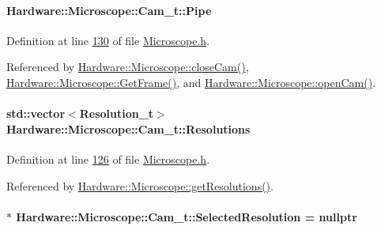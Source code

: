 \paragraph[{Pipe}]{ Hardware\+::\+Microscope\+::\+Cam\+\_\+t\+::\+Pipe}\label{struct_hardware_1_1_microscope_1_1_cam__t_a5cadb56c325736da812520b51c7fd65c}


Definition at line \hyperlink{_microscope_8h_source_l00130}{130} of file \hyperlink{_microscope_8h_source}{Microscope.\+h}.



Referenced by \hyperlink{_microscope_8cpp_source_l00311}{Hardware\+::\+Microscope\+::close\+Cam()}, \hyperlink{_microscope_8cpp_source_l00319}{Hardware\+::\+Microscope\+::\+Get\+Frame()}, and \hyperlink{_microscope_8cpp_source_l00167}{Hardware\+::\+Microscope\+::open\+Cam()}.

\hypertarget{struct_hardware_1_1_microscope_1_1_cam__t_a28496beff27af86c6305e0dd950001e9}{}
\paragraph[{Resolutions}]{\setlength{\rightskip}{0pt plus 5cm}std\+::vector$<${\bf Resolution\+\_\+t}$>$ Hardware\+::\+Microscope\+::\+Cam\+\_\+t\+::\+Resolutions}\label{struct_hardware_1_1_microscope_1_1_cam__t_a28496beff27af86c6305e0dd950001e9}


Definition at line \hyperlink{_microscope_8h_source_l00126}{126} of file \hyperlink{_microscope_8h_source}{Microscope.\+h}.



Referenced by \hyperlink{_microscope_8cpp_source_l00123}{Hardware\+::\+Microscope\+::get\+Resolutions()}.

\hypertarget{struct_hardware_1_1_microscope_1_1_cam__t_a85e4d902ee8a096450dbe544ec0ce773}{}
\paragraph[{Selected\+Resolution}]{$\ast$ Hardware\+::\+Microscope\+::\+Cam\+\_\+t\+::\+Selected\+Resolution = nullptr}\label{struct_hardware_1_1_microscope_1_1_cam__t_a85e4d902ee8a096450dbe544ec0ce773}


